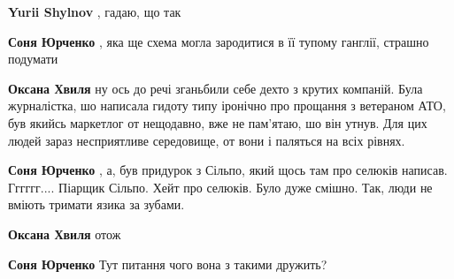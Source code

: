 \begin{itemize}
\begin{itemize}
\textbf{Yurii Shylnov} , гадаю, що так

 
\textbf{Соня Юрченко} , яка ще схема могла зародитися в її тупому ганглії, страшно подумати

 
\textbf{Оксана Хвиля} ну ось до речі зганьбили себе дехто з крутих компаній.
Була журналістка, шо написала гидоту типу іронічно про прощання з ветераном
АТО, був якийсь маркетлог от нещодавно, вже не пам'ятаю, шо він утнув. Для цих
людей зараз несприятливе середовище, от вони і паляться на всіх рівнях.

 
\textbf{Соня Юрченко} , а, був придурок з Сільпо, який щось там про селюків
написав. Гггггг.... Піарщик Сільпо. Хейт про селюків. Було дуже смішно. Так,
люди не вміють тримати язика за зубами.

 
\textbf{Оксана Хвиля} отож

 
\textbf{Соня Юрченко} Тут питання чого вона з такими дружить?

 

\end{itemize}
\end{itemize}
